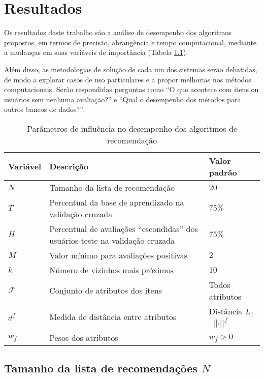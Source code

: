 \chapter[Resultados]{Resultados}
\label{chap:resultados}

Os resultados deste trabalho são a análise de desempenho dos algoritmos propostos, em termos de precisão, abrangência e tempo computacional, mediante a mudanças em suas variáveis de importância (Tabela \ref{tab:variaveis}).

Além disso, as metodologias de solução de cada um dos sistemas serão debatidas, de modo a explorar casos de uso particulares e a propor melhorias nos métodos computacionais. Serão respondidas perguntas como ``O que acontece com itens ou usuários sem nenhuma avaliação?'' e ``Qual o desempenho dos métodos para outros bancos de dados?''.

\begin{table}[hp]
\begin{center}
    \caption{Parâmetros de influência no desempenho dos algoritmos de recomendação}
    \label{tab:variaveis}
    \begin{tabular}{  | p{2cm} | p{7cm} | p{3.5cm} | } 
    \hline
    \textbf{Variável} & \textbf{Descrição} & \textbf{Valor padrão}  \\ \hline
    $N$ & Tamanho da lista de recomendação & $20$ \\ \hline   
    $T$ & Percentual da base de aprendizado na validação cruzada & $75\%$ \\ \hline
    $H$ & Percentual de avaliações ``escondidas'' dos usuários-teste na validação cruzada & $75\%$ \\ \hline
    $M$ & Valor mínimo para avaliações positivas & $2$ \\ \hline
    $k$ & Número de vizinhos mais próximos & $10$ \\ \hline
    $\mathcal{F}$ & Conjunto de atributos dos itens & Todos atributos \\ \hline
    $d^f$ & Medida de distância entre atributos & Distância $L_1$~$\left|\left|\cdot\right|\right|^f$ \\ \hline
    $w_f$ & Pesos dos atributos & $w_f>0$ \\ \hline
    \end{tabular}
\end{center}
\end{table}

\section{Tamanho da lista de recomendações $N$} %
\label{sec:tamanho_da_lista_de_recomenda_es_}

